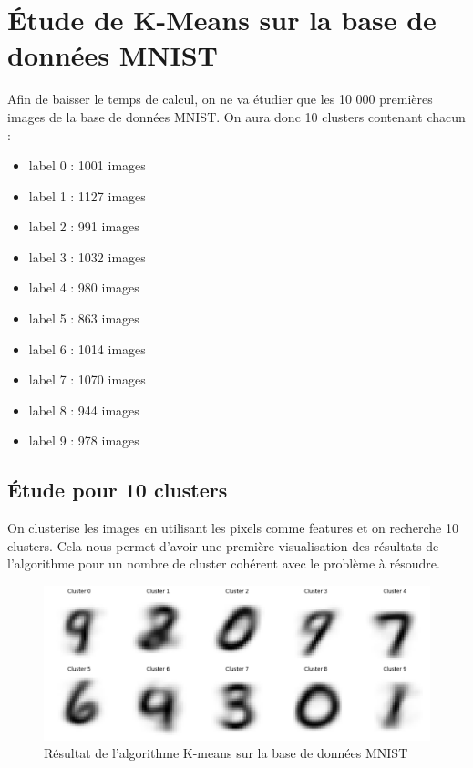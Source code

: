 \documentclass[french,a4paper,18pt]{article}
\begin{document}
\section{Étude de K-Means sur la base de données MNIST}


Afin de baisser le temps de calcul, on ne va étudier que les 10 000 premières images de la base de données MNIST.
On aura donc 10 clusters contenant chacun : 
\begin{itemize}
    \item label 0 : 1001 images
    \item label 1 : 1127 images
    \item label 2 : 991 images
    \item label 3 : 1032 images
    \item label 4 : 980 images
    \item label 5 : 863 images
    \item label 6 : 1014 images
    \item label 7 : 1070 images
    \item label 8 : 944 images
    \item label 9 : 978 images
\end{itemize}

\subsection{Étude pour 10 clusters}

On clusterise les images en utilisant les pixels comme features et on recherche 10 clusters.
Cela nous permet d'avoir une première visualisation des résultats de l'algorithme pour un nombre 
de cluster cohérent avec le problème à résoudre.

\begin{figure}[h!]
    \centering
    \includegraphics[scale=0.25]{../images/mnist_kmeans_ten_clusters.png}
    \caption{Résultat de l'algorithme K-means sur la base de données MNIST}\label{fig:mnist_kmeans}
\end{figure}
\end{document}
